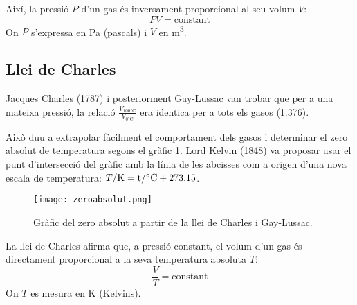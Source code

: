 Així, la pressió \( P \) d'un gas és inversament proporcional al seu volum \( V \):
\begin{equation}
    P V = \text{constant}
\end{equation}
On \( P \) s'expressa en \si{Pa} (pascals) i \( V \) en \si{m^3}.

\subsection{Llei de Charles}

Jacques Charles (1787) i posteriorment Gay-Lussac van trobar que per a una mateixa pressió, la relació $\frac{V_{100 \si\degreeCelsius}}{V_{0 \si\degreeCelsius}}$ era identica per a tots els gasos (1.376).

Això duu a extrapolar fàcilment el comportament dels gasos i determinar el zero absolut de temperatura segons el gràfic \ref{fig:zeroabsolut}. Lord Kelvin (1848) va proposar usar el punt d'intersecció del gràfic amb la línia de les abcisses com a origen d'una nova escala de temperatura: $T/\rm{K} = t/\si\degreeCelsius + 273.15$.
\begin{figure}[h]
\centering
\texttt{[image: zeroabsolut.png]}
\caption{Gràfic del zero absolut a partir de la llei de Charles i Gay-Lussac.}
\label{fig:zeroabsolut}
\end{figure}

La llei de Charles afirma que, a pressió constant, el volum d'un gas és directament proporcional a la seva temperatura absoluta \( T \):
\begin{equation}
    \frac{V}{T} = \text{constant}
\end{equation}
On \( T \) es mesura en \si{K} (Kelvins).

